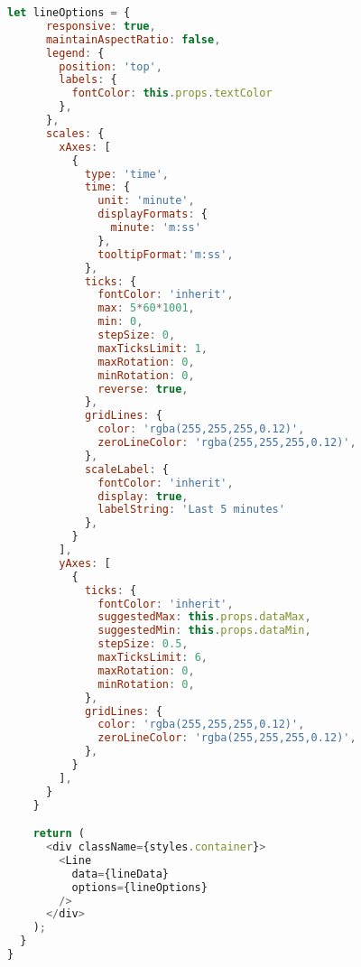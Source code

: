 \documentclass[12pt,a4paper,oneside]{book}
\begin{document}
\begin{lstlisting}[title={raspberrypi/ui/components/LineGraph.js}, language=JavaScript]
    let lineOptions = {
      responsive: true,
      maintainAspectRatio: false,
      legend: {
        position: 'top',
        labels: {
          fontColor: this.props.textColor
        },
      },
      scales: {
        xAxes: [
          {
            type: 'time',
            time: {
              unit: 'minute',
              displayFormats: {
                minute: 'm:ss'
              },
              tooltipFormat:'m:ss',
            },
            ticks: {
              fontColor: 'inherit',
              max: 5*60*1001,
              min: 0,
              stepSize: 0,
              maxTicksLimit: 1,
              maxRotation: 0,
              minRotation: 0,
              reverse: true,
            },
            gridLines: {
              color: 'rgba(255,255,255,0.12)',
              zeroLineColor: 'rgba(255,255,255,0.12)',
            },
            scaleLabel: {
              fontColor: 'inherit',
              display: true,
              labelString: 'Last 5 minutes'
            },
          }
        ],
        yAxes: [
          {
            ticks: {
              fontColor: 'inherit',
              suggestedMax: this.props.dataMax,
              suggestedMin: this.props.dataMin,
              stepSize: 0.5,
              maxTicksLimit: 6,
              maxRotation: 0,
              minRotation: 0,
            },
            gridLines: {
              color: 'rgba(255,255,255,0.12)',
              zeroLineColor: 'rgba(255,255,255,0.12)',
            },
          }
        ],
      }
    }

    return (
      <div className={styles.container}>
        <Line
          data={lineData}
          options={lineOptions}
        />
      </div>
    );
  }
}
\end{lstlisting}

\bigskip
\end{document}
